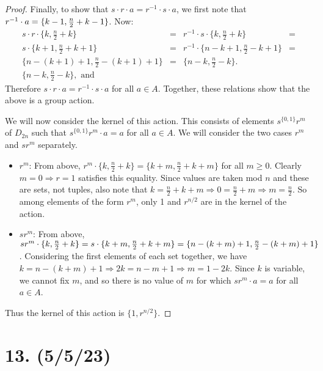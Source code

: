 \documentclass{article}
\begin{document}
\begin{proof}
  Finally, to show that $s \cdot r \cdot a = r^{-1} \cdot s \cdot a$, we first note that $r^{-1} \cdot a = \{ k - 1, \\ \frac{n}{2} + k - 1 \}$. Now:
  \begin{align*}
    s \cdot r \cdot \{ k, \frac{n}{2} + k \} &= & r^{-1} \cdot s \cdot \{ k, \frac{n}{2} + k \} &= \\
    s \cdot \{ k + 1, \frac{n}{2} + k + 1 \} &= & r^{-1} \cdot \{ n - k + 1, \frac{n}{2} - k + 1 \} &= \\
    \{ n - (k + 1) + 1, \frac{n}{2} - (k + 1) + 1 \} &= & \{ n - k, \frac{n}{2} - k \}. \\
    \{ n - k, \frac{n}{2} - k \}, \text{ and }
  \end{align*}
  Therefore $s \cdot r \cdot a = r^{-1} \cdot s \cdot a$ for all $a \in A$. Together, these relations show that the above is a group action.

  We will now consider the kernel of this action. This consists of elements $s^{\{0, 1\}}r^m$ of $D_{2n}$ such that $s^{\{0, 1\}}r^m \cdot a = a$ for all $a \in A$. We will consider the two cases $r^m$ and $sr^m$ separately.
  \begin{itemize}
    \item $r^m$: From above, $r^m \cdot \{ k, \frac{n}{2} + k \} = \{ k + m, \frac{n}{2} + k + m \}$ for all $m \geq 0$. Clearly $m = 0 \Rightarrow r = 1$ satisfies this equality. Since values are taken mod $n$ and these are sets, not tuples, also note that $k = \frac{n}{2} + k + m \Rightarrow 0 = \frac{n}{2} + m \Rightarrow m = \frac{n}{2}$. So among elements of the form $r^m$, only 1 and $r^{n/2}$ are in the kernel of the action.
    \item $sr^m$: From above, $sr^m \cdot \{ k, \frac{n}{2} + k \} = s \cdot \{ k + m, \frac{n}{2} + k + m \} = \\ \{ n - (k + m) + 1, \frac{n}{2} - (k + m) + 1 \}$. Considering the first elements of each set together, we have $k = n - (k + m) + 1 \Rightarrow 2k = n - m + 1 \Rightarrow m = 1 - 2k$. Since $k$ is variable, we cannot fix $m$, and so there is no value of $m$ for which $sr^m \cdot a = a$ for all $a \in A$.
  \end{itemize}
  Thus the kernel of this action is $\{ 1, r^{n/2} \}$.
\end{proof}

\section*{13. (5/5/23)}
\end{document}
